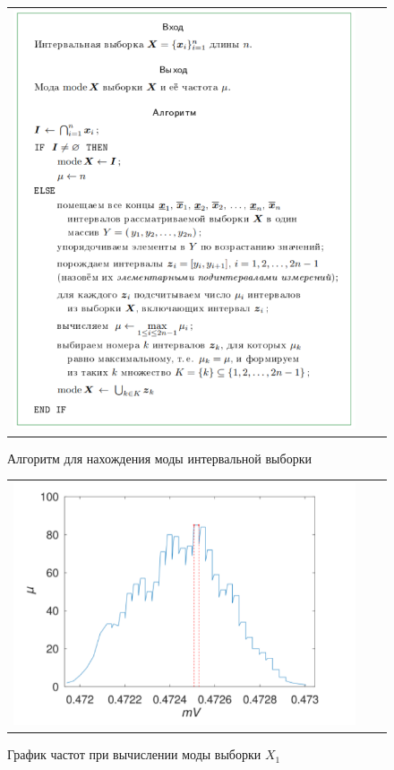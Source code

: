 \documentclass[a4paper,14pt]{article}
\begin{document}
	\begin{figure}[H]
		\begin{center}
			\begin{tabular}{ccc}
				\includegraphics[scale=0.7]{../image/algorithm.png}
			\end{tabular}
		\end{center}
		\caption{Алгоритм для нахождения моды интервальной выборки} 
	\end{figure}

	\begin{figure}[H]
		\begin{center}
			\begin{tabular}{ccc}
				\includegraphics[scale=0.7]{../image/mu_theory.png}
			\end{tabular}
		\end{center}
		\caption{График частот при вычислении моды выборки $X_1$} 
	\end{figure}
\end{document}
